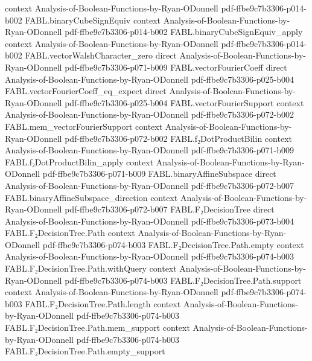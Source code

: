 \begin{theorem}
  {context}
  {Analysis-of-Boolean-Functions-by-Ryan-ODonnell}
  {pdf-ffbe9c7b3306-p014-b002}
\proofstep
  {FABL.binaryCubeSignEquiv}
  {context}
  {Analysis-of-Boolean-Functions-by-Ryan-ODonnell}
  {pdf-ffbe9c7b3306-p014-b002}
\proofstep
  {FABL.binaryCubeSignEquiv_apply}
  {context}
  {Analysis-of-Boolean-Functions-by-Ryan-ODonnell}
  {pdf-ffbe9c7b3306-p014-b002}
\proofstep
  {FABL.vectorWalshCharacter_zero}
  {direct}
  {Analysis-of-Boolean-Functions-by-Ryan-ODonnell}
  {pdf-ffbe9c7b3306-p071-b009}
\proofstep
  {FABL.vectorFourierCoeff}
  {direct}
  {Analysis-of-Boolean-Functions-by-Ryan-ODonnell}
  {pdf-ffbe9c7b3306-p025-b004}
\proofstep
  {FABL.vectorFourierCoeff_eq_expect}
  {direct}
  {Analysis-of-Boolean-Functions-by-Ryan-ODonnell}
  {pdf-ffbe9c7b3306-p025-b004}
\proofstep
  {FABL.vectorFourierSupport}
  {context}
  {Analysis-of-Boolean-Functions-by-Ryan-ODonnell}
  {pdf-ffbe9c7b3306-p072-b002}
\proofstep
  {FABL.mem_vectorFourierSupport}
  {context}
  {Analysis-of-Boolean-Functions-by-Ryan-ODonnell}
  {pdf-ffbe9c7b3306-p072-b002}
\proofstep
  {FABL.f₂DotProductBilin}
  {context}
  {Analysis-of-Boolean-Functions-by-Ryan-ODonnell}
  {pdf-ffbe9c7b3306-p071-b009}
\proofstep
  {FABL.f₂DotProductBilin_apply}
  {context}
  {Analysis-of-Boolean-Functions-by-Ryan-ODonnell}
  {pdf-ffbe9c7b3306-p071-b009}
\proofstep
  {FABL.binaryAffineSubspace}
  {direct}
  {Analysis-of-Boolean-Functions-by-Ryan-ODonnell}
  {pdf-ffbe9c7b3306-p072-b007}
\proofstep
  {FABL.binaryAffineSubspace_direction}
  {context}
  {Analysis-of-Boolean-Functions-by-Ryan-ODonnell}
  {pdf-ffbe9c7b3306-p072-b007}
\proofstep
  {FABL.F₂DecisionTree}
  {direct}
  {Analysis-of-Boolean-Functions-by-Ryan-ODonnell}
  {pdf-ffbe9c7b3306-p073-b004}
\proofstep
  {FABL.F₂DecisionTree.Path}
  {context}
  {Analysis-of-Boolean-Functions-by-Ryan-ODonnell}
  {pdf-ffbe9c7b3306-p074-b003}
\proofstep
  {FABL.F₂DecisionTree.Path.empty}
  {context}
  {Analysis-of-Boolean-Functions-by-Ryan-ODonnell}
  {pdf-ffbe9c7b3306-p074-b003}
\proofstep
  {FABL.F₂DecisionTree.Path.withQuery}
  {context}
  {Analysis-of-Boolean-Functions-by-Ryan-ODonnell}
  {pdf-ffbe9c7b3306-p074-b003}
\proofstep
  {FABL.F₂DecisionTree.Path.support}
  {context}
  {Analysis-of-Boolean-Functions-by-Ryan-ODonnell}
  {pdf-ffbe9c7b3306-p074-b003}
\proofstep
  {FABL.F₂DecisionTree.Path.length}
  {context}
  {Analysis-of-Boolean-Functions-by-Ryan-ODonnell}
  {pdf-ffbe9c7b3306-p074-b003}
\proofstep
  {FABL.F₂DecisionTree.Path.mem_support}
  {context}
  {Analysis-of-Boolean-Functions-by-Ryan-ODonnell}
  {pdf-ffbe9c7b3306-p074-b003}
\proofstep
  {FABL.F₂DecisionTree.Path.empty_support}

\end{theorem}

